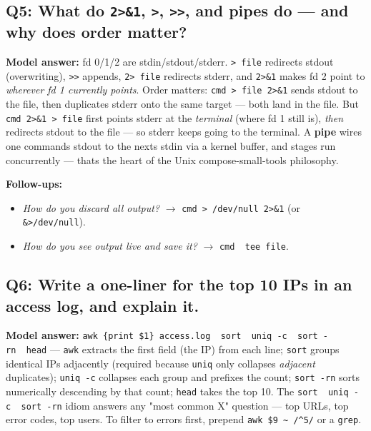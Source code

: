 \documentclass[11pt]{article}
\providecommand{\tightlist}{\setlength{\itemsep}{1pt}\setlength{\parskip}{0pt}}
\begin{document}
\subsection{\texorpdfstring{Q5: What do \texttt{2\textgreater{}\&1}, \texttt{\textgreater{}}, \texttt{\textgreater{}\textgreater{}}, and pipes do --- and why does order matter?}{Q5: What do 2\textgreater\&1, \textgreater, \textgreater\textgreater, and pipes do --- and why does order matter?}}\label{q5-what-do-21---and-pipes-do--and-why-does-order-matter}

\textbf{Model answer:} fd 0/1/2 are stdin/stdout/stderr. \texttt{\textgreater{}\ file} redirects stdout (overwriting), \texttt{\textgreater{}\textgreater{}} appends, \texttt{2\textgreater{}\ file} redirects stderr, and \texttt{2\textgreater{}\&1} makes fd 2 point to \emph{wherever fd 1 currently points}. Order matters: \texttt{cmd\ \textgreater{}\ file\ 2\textgreater{}\&1} sends stdout to the file, then duplicates stderr onto the same target --- both land in the file. But \texttt{cmd\ 2\textgreater{}\&1\ \textgreater{}\ file} first points stderr at the \emph{terminal} (where fd 1 still is), \emph{then} redirects stdout to the file --- so stderr keeps going to the terminal. A \textbf{pipe} wires one command\textquotesingle s stdout to the next\textquotesingle s stdin via a kernel buffer, and stages run concurrently --- that\textquotesingle s the heart of the Unix compose-small-tools philosophy.

\textbf{Follow-ups:}

\begin{itemize}
\tightlist
\item
  \emph{How do you discard all output?} \(\rightarrow\) \texttt{cmd\ \textgreater{}\ /dev/null\ 2\textgreater{}\&1} (or \texttt{\&\textgreater{}/dev/null}).
\item
  \emph{How do you see output live and save it?} \(\rightarrow\) \texttt{cmd\ \textbar{}\ tee\ file}.
\end{itemize}

\subsection{Q6: Write a one-liner for the top 10 IPs in an access log, and explain it.}\label{q6-write-a-one-liner-for-the-top-10-ips-in-an-access-log-and-explain-it}

\textbf{Model answer:} \texttt{awk\ \textquotesingle{}\{print\ \$1\}\textquotesingle{}\ access.log\ \textbar{}\ sort\ \textbar{}\ uniq\ -c\ \textbar{}\ sort\ -rn\ \textbar{}\ head} --- \texttt{awk} extracts the first field (the IP) from each line; \texttt{sort} groups identical IPs adjacently (required because \texttt{uniq} only collapses \emph{adjacent} duplicates); \texttt{uniq\ -c} collapses each group and prefixes the count; \texttt{sort\ -rn} sorts numerically descending by that count; \texttt{head} takes the top 10. The \texttt{sort\ \textbar{}\ uniq\ -c\ \textbar{}\ sort\ -rn} idiom answers any "most common X" question --- top URLs, top error codes, top users. To filter to errors first, prepend \texttt{awk\ \textquotesingle{}\$9\ \textasciitilde{}\ /\^{}5/\textquotesingle{}} or a \texttt{grep}.
\end{document}
